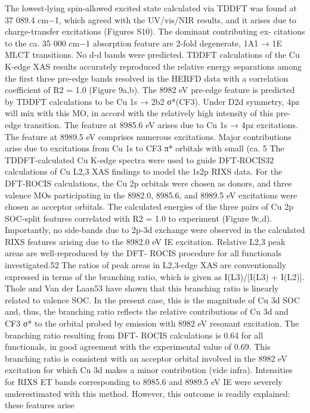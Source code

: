 The lowest-lying spin-allowed excited state calculated via
TDDFT was found at 37 089.4 cm−1, which agreed with the
UV/vis/NIR results, and it arises due to charge-transfer
excitations (Figures S10). The dominant contributing ex-
citations to the ca. 35 000 cm−1 absorption feature are 2-fold
degenerate, 1A1 → 1E MLCT transitions. No d-d bands were
predicted. TDDFT calculations of the Cu K-edge XAS results
accurately reproduced the relative energy separations among
the ﬁrst three pre-edge bands resolved in the HERFD data with
a correlation coeﬃcient of R2 = 1.0 (Figure 9a,b). The 8982 eV
pre-edge feature is predicted by TDDFT calculations to be Cu
1s → 2b2 σ*(CF3). Under D2d symmetry, 4pz will mix with this
MO, in accord with the relatively high intensity of this pre-edge
transition. The feature at 8985.6 eV arises due to Cu 1s → 4pz
excitations. The feature at 8989.5 eV comprises numerous
excitations. Major contributions arise due to excitations from
Cu 1s to CF3 π* orbitals with small (ca. 5%
The TDDFT-calculated Cu K-edge spectra were used to
guide DFT-ROCIS32 calculations of Cu L2,3 XAS ﬁndings to
model the 1s2p RIXS data. For the DFT-ROCIS calculations,
the Cu 2p orbitals were chosen as donors, and three valence
MOs participating in the 8982.0, 8985.6, and 8989.5 eV
excitations were chosen as acceptor orbitals. The calculated
energies of the three pairs of Cu 2p SOC-split features
correlated with R2 = 1.0 to experiment (Figure 9c,d).
Importantly, no side-bands due to 2p-3d exchange were
observed in the calculated RIXS features arising due to the
8982.0 eV IE excitation.
Relative L2,3 peak areas are well-reproduced by the DFT-
ROCIS procedure for all functionals investigated.52 The ratios
of peak areas in L2,3-edge XAS are conventionally expressed in
terms of the branching ratio, which is given as I(L3)/[I(L3) +
I(L2)]. Thole and Van der Laan53 have shown that this
branching ratio is linearly related to valence SOC. In the
present case, this is the magnitude of Cu 3d SOC and, thus, the
branching ratio reﬂects the relative contributions of Cu 3d and
CF3 σ* to the orbital probed by emission with 8982 eV
resonant excitation. The branching ratio resulting from DFT-
ROCIS calculations is 0.64 for all functionals, in good
agreement with the experimental value of 0.69. This branching
ratio is consistent with an acceptor orbital involved in the 8982
eV excitation for which Cu 3d makes a minor contribution
(vide infra).
Intensities for RIXS ET bands corresponding to 8985.6 and
8989.5 eV IE were severely underestimated with this method.
However, this outcome is readily explained: these features arise

